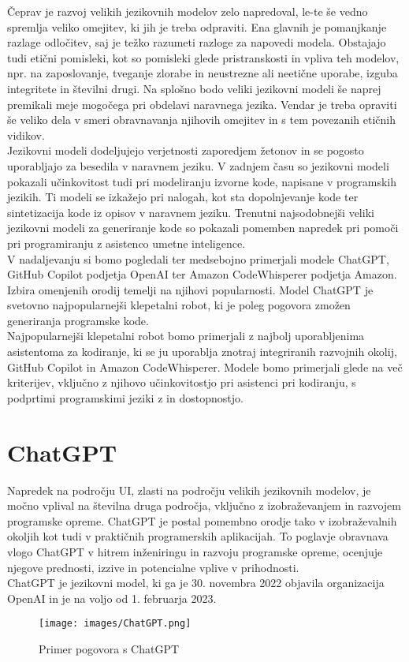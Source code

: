 \documentclass[a4paper,12pt,openright]{book}
\begin{document}
Čeprav je razvoj velikih jezikovnih modelov zelo napredoval, le-te še vedno spremlja veliko omejitev, ki jih je treba odpraviti. Ena glavnih je pomanjkanje razlage odločitev, saj je težko razumeti razloge za napovedi modela. Obstajajo tudi etični pomisleki, kot so pomisleki glede pristranskosti in vpliva teh modelov, npr. na zaposlovanje, tveganje zlorabe in neustrezne ali neetične uporabe, izguba integritete in številni drugi. Na splošno bodo veliki jezikovni modeli še naprej premikali meje mogočega pri obdelavi naravnega jezika. Vendar je treba opraviti še veliko dela v smeri obravnavanja njihovih omejitev in s tem povezanih etičnih vidikov.\cite{KASNECI2023102274} \\
Jezikovni modeli dodeljujejo verjetnosti zaporedjem žetonov in se pogosto uporabljajo za besedila v naravnem jeziku. V zadnjem času so jezikovni modeli pokazali učinkovitost tudi pri modeliranju izvorne kode, napisane v programskih jezikih. Ti modeli se izkažejo pri nalogah, kot sta dopolnjevanje kode ter sintetizacija kode iz opisov v naravnem jeziku.
Trenutni najsodobnejši veliki jezikovni modeli za generiranje kode so pokazali pomemben napredek pri pomoči pri programiranju z asistenco umetne inteligence.  \cite{vaswani2023attention} \\
V nadaljevanju si bomo pogledali ter medsebojno primerjali modele ChatGPT, GitHub Copilot podjetja OpenAI ter Amazon CodeWhisperer podjetja Amazon. Izbira omenjenih orodij temelji na njihovi popularnosti. Model ChatGPT je svetovno najpopularnejši klepetalni robot, ki je poleg pogovora zmožen generiranja programske kode\cite{wu2023brief}. \\
Najpopularnejši klepetalni robot bomo primerjali z najbolj uporabljenima asistentoma za kodiranje, ki se ju uporablja znotraj integriranih razvojnih okolij, GitHub Copilot in Amazon CodeWhisperer. Modele bomo primerjali glede na več kriterijev, vključno z njihovo učinkovitostjo pri asistenci pri kodiranju, s podprtimi programskimi jeziki z in dostopnostjo.

\section{ChatGPT}
Napredek na področju UI, zlasti na področju velikih jezikovnih modelov, je močno vplival na številna druga področja, vključno z izobraževanjem in razvojem programske opreme. ChatGPT je postal pomembno orodje tako v izobraževalnih okoljih kot tudi v praktičnih programerskih aplikacijah. To poglavje obravnava vlogo ChatGPT v hitrem inženiringu in razvoju programske opreme, ocenjuje njegove prednosti, izzive in potencialne vplive v prihodnosti. \\
ChatGPT je jezikovni model, ki ga je 30. novembra 2022 objavila organizacija OpenAI in je na voljo od 1. februarja 2023. \cite{openai_codex} \\
\begin{figure}[H]
    \centering
    \texttt{[image: images/ChatGPT.png]}
    \caption{Primer pogovora s ChatGPT}
    \label{fig:ChatGPT}
\end{figure}
\end{document}
